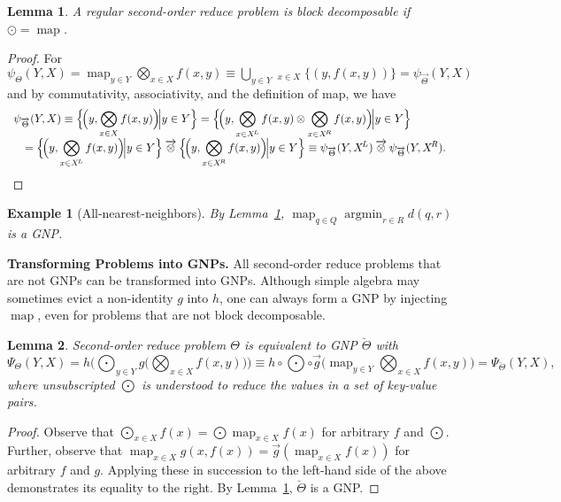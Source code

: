 \documentclass{article}
\newtheorem{lemma}{Lemma}
\newtheorem{example} {Example}
\newcommand{\killspace}{\vspace{-0.1in}}
\newcommand{\GNP}[1][\psi]{{#1}_{\Theta}}
\newcommand{\GNPvec}[1][\psi]{{#1}_{\overrightarrow{\Theta}}}
\newcommand{\otimesvec}{\mathbin{\overrightarrow{\otimes}}}
\newcommand{\bigotimesvec}{\mathop{\overrightarrow{\bigotimes}}}
\DeclareMathOperator*{\argmin}{argmin}
\DeclareMathOperator*{\map}{map}
\newcommand{\comp}{\mathbin{\circ}}
\begin{document}
\begin{lemma}\label{lem:map}
  A regular second-order reduce problem is block decomposable if
  $\odot = \map$.
\end{lemma}
\killspace
\begin{proof}
  For $\GNP(Y,X) = \map_{y \in Y} \bigotimes_{x \in X} f(x,y) \equiv
  \bigcup_{y \in Y} \bigotimesvec_{x \in X} \{(y,f(x,y))\} =
  \GNPvec(Y,X)$ and by commutativity, associativity, and the
  definition of map, we have
  \[ \begin{array}{ll}
    \multicolumn{2}{l}{\displaystyle \GNPvec(Y,X) \equiv \Big\{ \!\Big( y,\bigotimes_{x \in X} f(x,y) \Big)\! \Big| y \in Y \Big\} = \Big\{ \!\Big( y,\bigotimes_{x \in X^{\!L}} f(x,y) \otimes \bigotimes_{x \in X^{\!R}} f(x,y) \Big)\! \Big| y \in Y \Big\}} \\
    & \displaystyle = \Big\{ \!\Big( y,\bigotimes_{x \in X^{\!L}} f(x,y) \Big)\! \Big| y \in Y \Big\} \otimesvec \Big\{ \!\Big( y,\bigotimes_{x \in X^{\!R}} f(x,y) \Big)\! \Big| y \in Y \Big\} \equiv \GNPvec(Y,X^{\!L}) \otimesvec \GNPvec(Y,X^{\!R}).
  \end{array} \]
\end{proof}

\begin{example}[All-nearest-neighbors]
  By Lemma~\ref{lem:map}, $\map_{q \in Q} \argmin_{r \in R} d(q,r)$ is
  a GNP.
\end{example}


{\bf Transforming Problems into GNPs.}  All second-order reduce
problems that are not GNPs can be transformed into GNPs.
Although simple algebra may sometimes evict a non-identity $g$ into $h$, one can always form a GNP by injecting $\map$, even for problems that are not block decomposable.
\begin{lemma}
  Second-order reduce problem $\Theta$ is equivalent to GNP
  $\breve{\Theta}$ with
  \[
  \Psi_{\Theta}(Y,X) = h \Big( \bigodot_{y \in Y} g \Big( \bigotimes_{x \in X} f(x,y) \Big) \Big) \equiv h \comp {\textstyle \bigodot} \comp \overrightarrow{g} \Big( \map_{y \in Y} \bigotimes_{x \in X} f(x,y) \Big) = \Psi_{\breve{\Theta}}(Y,X),
  \]
  where unsubscripted $\bigodot$ is understood to reduce the values in
  a set of key-value pairs.
\end{lemma}
\killspace
\begin{proof}
  Observe that $\bigodot_{x \in X} f(x) = \bigodot{} \map_{x \in X}
  f(x)$ for arbitrary $f$ and $\bigodot$.  Further, observe that
  $\map_{x \in X} g(x,f(x)) = \overrightarrow{g} \left( \map_{x \in X}
  f(x) \right)$ for arbitrary $f$ and $g$.  Applying these in
  succession to the left-hand side of the above demonstrates its
  equality to the right.  By Lemma~\ref{lem:map}, $\breve{\Theta}$ is
  a GNP.
\end{proof}
\end{document}
